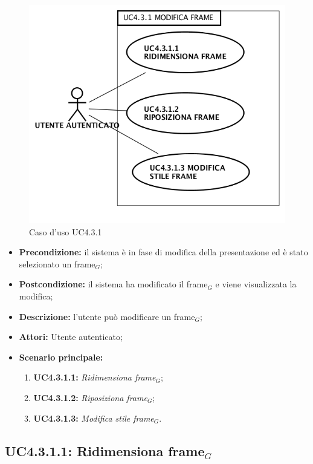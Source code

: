 \begin{figure}[h]
	\begin{center}
	\includegraphics[scale=0.4]{diagram/UC4-3-1.png}
	\caption{Caso d'uso UC4.3.1}
	\end{center}
\end{figure}
\begin{itemize}
	\item \textbf{Precondizione:} il sistema è in fase di modifica della presentazione ed è stato selezionato un frame$_G$;
	\item \textbf{Postcondizione:} il sistema ha modificato il frame$_G$ e viene visualizzata la modifica;
	\item \textbf{Descrizione:} l'utente può modificare un frame$_G$;
	\item \textbf{Attori:} Utente autenticato;
	\item \textbf{Scenario principale:}
	\begin{enumerate}
		\item \textbf{ UC4.3.1.1:} \textit{ Ridimensiona frame$_G$};
		\item \textbf{ UC4.3.1.2:} \textit{ Riposiziona frame$_G$};
		\item \textbf{ UC4.3.1.3:} \textit{ Modifica stile frame$_G$}.
	\end{enumerate}
\end{itemize}
\subsection{ UC4.3.1.1: Ridimensiona frame$_G$}

